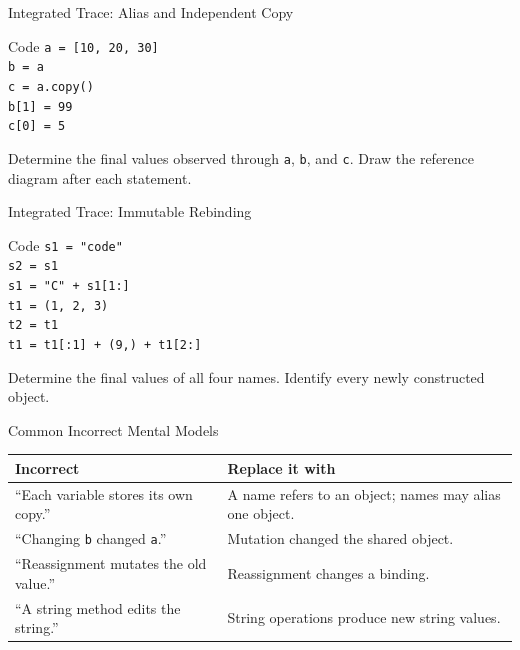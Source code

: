 \documentclass[aspectratio=169,10pt]{beamer}
\begin{document}

\begin{frame}{Integrated Trace: Alias and Independent Copy}
  \begin{block}{Code}
    \texttt{a = [10, 20, 30]}\\
    \texttt{b = a}\\
    \texttt{c = a.copy()}\\
    \texttt{b[1] = 99}\\
    \texttt{c[0] = 5}
  \end{block}

  \begin{activity}
    Determine the final values observed through \texttt{a}, \texttt{b}, and \texttt{c}. Draw the reference diagram after each statement.
  \end{activity}
\end{frame}

\begin{frame}{Integrated Trace: Immutable Rebinding}
  \begin{block}{Code}
    \texttt{s1 = "code"}\\
    \texttt{s2 = s1}\\
    \texttt{s1 = "C" + s1[1:]}\\[0.08in]
    \texttt{t1 = (1, 2, 3)}\\
    \texttt{t2 = t1}\\
    \texttt{t1 = t1[:1] + (9,) + t1[2:]}
  \end{block}

  \begin{activity}
    Determine the final values of all four names. Identify every newly constructed object.
  \end{activity}
\end{frame}

\begin{frame}{Common Incorrect Mental Models}
  \begin{center}
    \renewcommand{\arraystretch}{1.3}
    \begin{tabular}{p{}|p{}}
      \textbf{Incorrect} & \textbf{Replace it with} \\\hline
      ``Each variable stores its own copy.'' & A name refers to an object; names may alias one object. \\
      ``Changing \texttt{b} changed \texttt{a}.'' & Mutation changed the shared object. \\
      ``Reassignment mutates the old value.'' & Reassignment changes a binding. \\
      ``A string method edits the string.'' & String operations produce new string values.
    \end{tabular}
  \end{center}
\end{frame}
\end{document}

